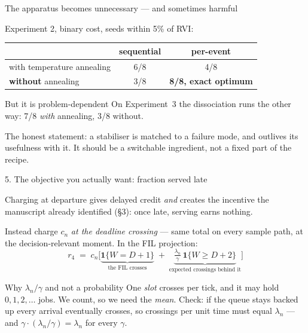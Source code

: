\documentclass[11pt,aspectratio=169]{beamer}
\newcommand{\good}[1]{\textbf{#1}}
\begin{document}
\begin{frame}{The apparatus becomes unnecessary --- and sometimes harmful}

Experiment 2, binary cost, seeds within 5\% of RVI:

\begin{center}
\begin{tabular}{lcc}
\toprule
 & sequential & per-event \\
\midrule
with temperature annealing    & 6/8 & 4/8 \\
\good{without} annealing      & 3/8 & \good{8/8, exact optimum} \\
\bottomrule
\end{tabular}
\end{center}

\vfill
\begin{block}{But it is problem-dependent}
On Experiment~3 the dissociation runs the other way: 7/8 \emph{with} annealing,
3/8 without.
\end{block}

\vfill
The honest statement: a stabiliser is matched to a failure mode, and outlives
its usefulness with it.  It should be a switchable ingredient, not a fixed part
of the recipe.

\end{frame}

\begin{frame}{5. The objective you actually want: fraction served late}

Charging at departure gives delayed credit \emph{and} creates the incentive the
manuscript already identified (\S3): once late, serving earns nothing.

\vfill
Instead charge $c_n$ \emph{at the deadline crossing} --- same total on every
sample path, at the decision-relevant moment.  In the FIL projection:
\[
  r_4 \;=\; c_n\Big[\underbrace{\mathbf{1}\{W = D+1\}}_{\text{the FIL crosses}}
  \;+\; \underbrace{\tfrac{\lambda_n}{\gamma}\,\mathbf{1}\{W \ge D+2\}}_{\text{expected crossings behind it}}\Big]
\]

\vfill
\begin{block}{Why $\lambda_n/\gamma$ and not a probability}
One \emph{slot} crosses per tick, and it may hold $0,1,2,\dots$ jobs.  We count,
so we need the \emph{mean}.  Check: if the queue stays backed up every arrival
eventually crosses, so crossings per unit time must equal $\lambda_n$ ---
and $\gamma \cdot (\lambda_n/\gamma) = \lambda_n$ for every $\gamma$.
\end{block}

\end{frame}
\end{document}
